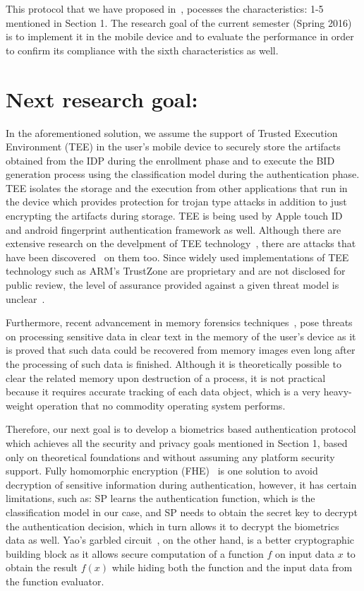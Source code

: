 \documentclass[10pt]{article}
\begin{document}
This protocol that we have proposed in~\cite{ours}, pocesses the characteristics: 1-5 mentioned in Section 1. The research goal of the current 
semester (Spring 2016) is to implement it in the mobile device and to evaluate the performance in order to confirm its compliance with the sixth 
characteristics as well.

\section{Next research goal:}
In the aforementioned solution, we assume the support of Trusted Execution Environment  (TEE) in the user's mobile device to securely store the 
artifacts obtained from the IDP during the enrollment phase and to execute the BID generation process using the classification model during the 
authentication phase. 
TEE isolates the storage and the execution from other applications that run in the device which provides protection for trojan type attacks in 
addition to just encrypting the artifacts during storage. TEE is being used by Apple touch ID and android fingerprint authentication framework 
as well.
Although there are extensive research on the develpment of TEE technology~\cite{tee}, there are attacks that have been discovered~\cite{blackhat} on 
them too.
Since widely used implementations of TEE technology such as ARM's TrustZone are proprietary and are not disclosed for public review, the level of 
assurance provided against a given threat model is unclear~\cite{armtrustzone}. 

Furthermore, recent advancement in memory forensics techniques~\cite{dimsum}, pose threats on processing sensitive data in clear text in the memory 
of the user's device as it is proved that such data could be recovered from memory images even long after the processing of such data is finished. 
Although it is theoretically possible to clear the related memory upon destruction of a process, it is not practical because it requires 
accurate tracking of each data object, which is a very heavy-weight operation that no commodity operating system performs.

Therefore, our next goal is to develop a biometrics based authentication protocol which achieves all the security and 
privacy goals mentioned in Section 1, based only on theoretical foundations and without assuming any platform security support. Fully homomorphic 
encryption (FHE)~\cite{fhe} is one solution to avoid decryption of sensitive information during authentication, however, it has certain 
limitations, such as: SP learns the authentication function, which is the classification model 
in our case, and SP needs to obtain the secret key to decrypt the authentication decision, which in turn allows it to decrypt the biometrics data 
as well. 
Yao's garbled circuit~\cite{yaogc}, on the other hand, is a better cryptographic 
building block as it allows secure computation of a function $f$ on input data $x$ to obtain the result $f(x)$ while hiding both the function and the 
input data from the function evaluator.
\end{document}
